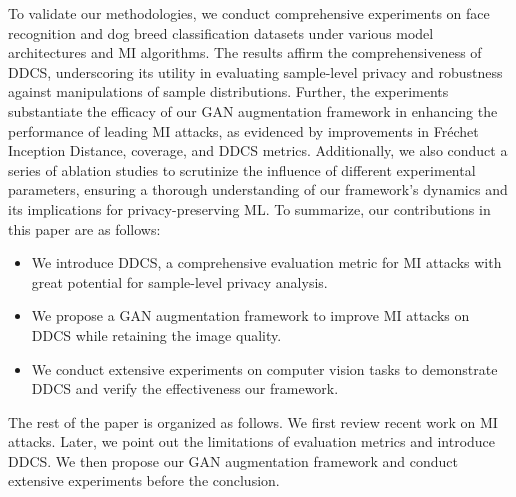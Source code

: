 To validate our methodologies, we conduct comprehensive experiments on face recognition and dog breed classification datasets under various model architectures and MI algorithms. The results affirm the comprehensiveness of DDCS, underscoring its utility in evaluating sample-level privacy and robustness against manipulations of sample distributions. Further, the experiments substantiate the efficacy of our GAN augmentation framework in enhancing the performance of leading MI attacks, as evidenced by improvements in Fr\'echet Inception Distance, coverage, and DDCS metrics. Additionally, we also conduct a series of ablation studies to scrutinize the influence of different experimental parameters, ensuring a thorough understanding of our framework's dynamics and its implications for privacy-preserving ML.
To summarize, our contributions in this paper are as follows:
\begin{itemize}
	\item
	We introduce DDCS, a comprehensive evaluation metric for MI attacks with great potential for sample-level privacy analysis.
	\item
	We propose a GAN augmentation framework to improve MI attacks on DDCS while retaining the image quality.
	\item
	We conduct extensive experiments on computer vision tasks to demonstrate DDCS and verify the effectiveness our framework.
\end{itemize}

The rest of the paper is organized as follows.
We first review recent work on MI attacks.
Later, we point out the limitations of evaluation metrics and introduce DDCS.
We then propose our GAN augmentation framework and conduct extensive experiments before the conclusion. 

